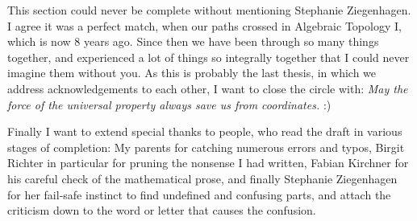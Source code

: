 This section could never be complete without mentioning Stephanie Ziegenhagen. I agree it
was a perfect match, when our paths crossed in Algebraic Topology I, which is now 8 years ago. Since
then we have been through so many things together, and experienced a lot of things so integrally 
together that I could never imagine them without you. As this is probably the last thesis, in which
we address acknowledgements to each other, I want to close the circle with: \emph{May the force of the
universal property always save us from coordinates.} :)

Finally I want to extend special thanks to people, who read the draft in various stages of completion:
My parents for catching numerous errors and typos, Birgit Richter in particular for pruning the 
nonsense I had written, Fabian Kirchner for his careful check of the mathematical prose, and finally
Stephanie Ziegenhagen for her fail-safe instinct to find undefined and confusing parts, and attach
the criticism down to the word or letter that causes the confusion.
